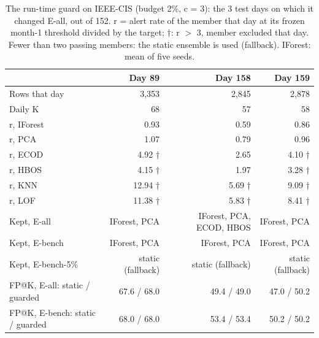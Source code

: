 \begin{table}[t]
\centering
\small
\setlength{\tabcolsep}{4pt}
\caption{The run-time guard on IEEE-CIS (budget 2\%, c = 3): the 3 test days on which it changed E-all, out of 152. r = alert rate of the member that day at its frozen month-1 threshold divided by the target; $\dagger$: r $>$ 3, member excluded that day. Fewer than two passing members: the static ensemble is used (fallback). IForest: mean of five seeds.}
\label{tab:guard-events}
\begin{tabular}{lrrr}
\toprule
 & Day 89 & Day 158 & Day 159 \\
\midrule
Rows that day & 3,353 & 2,845 & 2,878 \\
Daily K & 68 & 57 & 58 \\
r, IForest & 0.93 & 0.59 & 0.86 \\
r, PCA & 1.07 & 0.79 & 0.96 \\
r, ECOD & 4.92 † & 2.65 & 4.10 † \\
r, HBOS & 4.15 † & 1.97 & 3.28 † \\
r, KNN & 12.94 † & 5.69 † & 9.09 † \\
r, LOF & 11.38 † & 5.83 † & 8.41 † \\
Kept, E-all & IForest, PCA & IForest, PCA, ECOD, HBOS & IForest, PCA \\
Kept, E-bench & IForest, PCA & IForest, PCA & IForest, PCA \\
Kept, E-bench-5\% & static (fallback) & static (fallback) & static (fallback) \\
FP@K, E-all: static / guarded & 67.6 / 68.0 & 49.4 / 49.0 & 47.0 / 50.2 \\
FP@K, E-bench: static / guarded & 68.0 / 68.0 & 53.4 / 53.4 & 50.2 / 50.2 \\
\bottomrule
\end{tabular}
\end{table}
